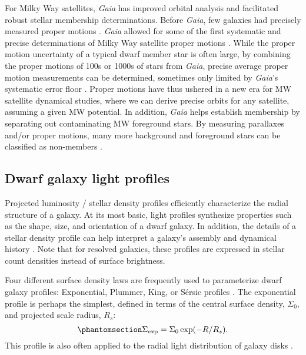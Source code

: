 For Milky Way satellites, \emph{Gaia} has improved orbital analysis and
facilitated robust stellar membership determinations. Before
\emph{Gaia}, few galaxies had precisely measured proper motions
\citep[e.g.~using Hubble Space Telescope,][]{piatek+2005, sohn+2017}.
\emph{Gaia} allowed for some of the first systematic and precise
determinations of Milky Way satellite proper motions
\citep{pace+li2019, MV2020a}. While the proper motion uncertainty of a
typical dwarf member star is often large, by combining the proper
motions of 100s or 1000s of stars from \emph{Gaia}, precise average
proper motion measurements can be determined, sometimes only limited by
\emph{Gaia}'s systematic error floor \citep[e.g.,][]{MV2020a}. Proper
motions have thus ushered in a new era for MW satellite dynamical
studies, where we can derive precise orbits for any satellite, assuming
a given MW potential. In addition, \emph{Gaia} helps establish
membership by separating out contaminating MW foreground stars. By
measuring parallaxes and/or proper motions, many more background and
foreground stars can be classified as non-members
\citep[e.g.,][]{battaglia+2022, jensen+2024}.

\subsection{Dwarf galaxy light profiles}\label{sec:exponential_profiles}

Projected luminosity / stellar density profiles efficiently characterize
the radial structure of a galaxy. At its most basic, light profiles
synthesize properties such as the shape, size, and orientation of a
dwarf galaxy. In addition, the details of a stellar density profile can
help interpret a galaxy's assembly and dynamical history
\citep[e.g.,][]{penarrubia+2009, lee+2018, querci+2025}. Note that for
resolved galaxies, these profiles are expressed in stellar count
densities instead of surface brightness.

Four different surface density laws are frequently used to parameterize
dwarf galaxy profiles: Exponential, Plummer, King, or Sérsic profiles
\citep[e.g.,][]{munoz+2018}. The exponential profile is perhaps the
simplest, defined in terms of the central surface density, \(\Sigma_0\),
and projected scale radius, \(R_s\):
\begin{equation}\protect\phantomsection\label{eq:exponential_law}{
\Sigma_{\rm exp} = \Sigma_0\exp(-R / R_s).
}\end{equation} This profile is also often applied to the radial light
distribution of galaxy disks
\citep{devaucouleurs1959a, freeman1970, kent1985}.


